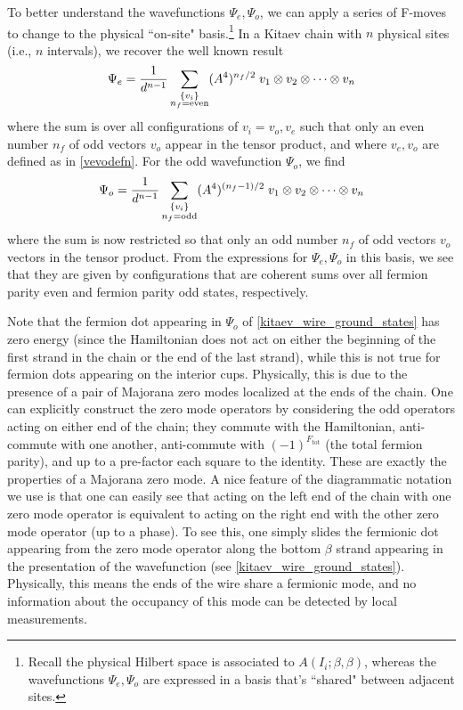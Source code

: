 To better understand the wavefunctions $\Psi_e,\Psi_o$, we can apply a series of F-moves to change to the physical ``on-site" basis.\footnote{Recall the physical Hilbert space is associated to $A(I_i;\beta, \beta)$, 
whereas the wavefunctions $\Psi_e,\Psi_o$ are expressed in a basis that's ``shared" between adjacent sites.}
In a Kitaev chain with $n$ physical sites (i.e., $n$ intervals), 
we recover the well known result
\begin{align}
\Psi_e = \frac{1}{d^{n-1}} \sum_{\substack{ \{ v_i\} \\  n_f = \text{even} }} (A^4)^{n_f/2} \; v_1 \otimes v_2 \otimes \cdots \otimes v_n
\end{align}
where the sum is over all configurations of $v_i =v_o,v_e$ such that only an even number $n_f$ of odd vectors $v_o$ appear 
in the tensor product, and where $v_e,v_o$ are defined as in \eqref{vevodefn}.
For the odd wavefunction $\Psi_o$, we find 
\begin{align}
\Psi_o = \frac{1}{d^{n-1}}\sum_{\substack{ \{ v_i\} \\  n_f = \text{odd} }}  (A^4)^{(n_f-1)/2}\; v_1 \otimes v_2 \otimes \cdots \otimes v_n
\end{align}
where the sum is now restricted so that only an odd number $n_f$ of odd vectors $v_o$ vectors in the tensor product.
From the expressions for $\Psi_e,\Psi_o$ in this basis, we see that they are given by configurations 
that are coherent sums over all fermion parity even and fermion parity odd states, respectively.  

Note that the fermion dot appearing in $\Psi_o$ of \eqref{kitaev_wire_ground_states} has zero energy (since the Hamiltonian does not act on either the beginning of the first strand in the chain or the end of the last strand), while this is not true for fermion dots 
appearing on the interior cups. 
Physically, this is due to the presence of a pair of Majorana zero modes localized at the ends of the chain. 
One can explicitly construct the zero mode operators by considering the odd operators acting on either end of the chain; 
they commute with the Hamiltonian, anti-commute with one another, anti-commute with $(-1)^{F_\text{tot}}$ (the total fermion parity), and up to a pre-factor each square to the identity.
These are exactly the properties of a Majorana zero mode. 
A nice feature of the diagrammatic notation we use is that one can easily see that acting on the left end of the chain with one zero mode operator is equivalent to acting on the right end with the other zero mode operator (up to a phase).
To see this, one simply slides the fermionic dot appearing from the zero mode operator along the bottom $\beta$ strand appearing in the presentation of the wavefunction (see \eqref{kitaev_wire_ground_states}).
Physically, this means the ends of the wire share a fermionic mode, 
and no information about the occupancy of this mode can be detected by local measurements.


